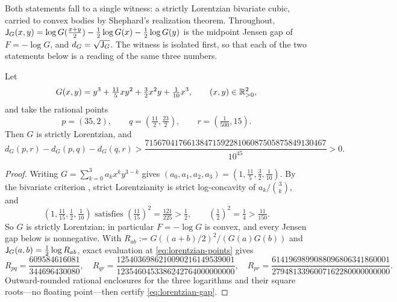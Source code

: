 \begin{cxrefutation}
Both statements fall to a single witness: a strictly Lorentzian bivariate cubic, carried to convex bodies by Shephard's realization theorem.  Throughout, $\mathsf{J}_G(x,y)=\log G(\frac{x+y}2)-\frac12\log G(x)-\frac12\log G(y)$ is the midpoint Jensen gap of $F=-\log G$, and $d_G=\sqrt{\mathsf{J}_G}$.  The witness is isolated first, so that each of the two statements below is a reading of the same three numbers.

\begin{lemma}\label{lem:lorentzian-cubic}
Let
\begin{equation}\label{eq:lorentzian-cubic}
G(x,y)=y^3+\tfrac{11}5xy^2+\tfrac32x^2y+\tfrac1{10}x^3,\qquad(x,y)\in\mathbb R_{>0}^2,
\end{equation}
and take the rational points
\begin{equation}\label{eq:lorentzian-points}
p=(35,2),\qquad q=\left(\tfrac{11}2,\tfrac{23}2\right),\qquad r=\left(\tfrac1{500},15\right).
\end{equation}
Then $G$ is strictly Lorentzian, and
\begin{equation}\label{eq:lorentzian-gap}
d_G(p,r)-d_G(p,q)-d_G(q,r)>\frac{7156704176613847159228106087505875849130467}{10^{45}}>0.
\end{equation}
\end{lemma}
\begin{proof}
Writing $G=\sum_{k=0}^3a_kx^ky^{3-k}$ gives $(a_0,a_1,a_2,a_3)=(1,\frac{11}5,\frac32,\frac1{10})$.  By the bivariate criterion \cite[Example~2.3]{BrandenHuh}, strict Lorentzianity is strict log-concavity of $a_k/\binom3k$, and
\[
\left(1,\tfrac{11}{15},\tfrac12,\tfrac1{10}\right)
\text{ satisfies }
\left(\tfrac{11}{15}\right)^2=\tfrac{121}{225}>\tfrac12,\qquad
\left(\tfrac12\right)^2=\tfrac14>\tfrac{11}{150}.
\]
So $G$ is strictly Lorentzian; in particular $F=-\log G$ is convex, and every Jensen gap below is nonnegative.  With $R_{ab}:=G((a+b)/2)^2/(G(a)G(b))$ and $\mathsf{J}_G(a,b)=\frac12\log R_{ab}$, exact evaluation at \eqref{eq:lorentzian-points} gives
\[
R_{pq}=\frac{609584616081}{344696430080},\quad
R_{qr}=\frac{1254036986210090216149539001}{1235460453386242764000000000},\quad
R_{pr}=\frac{6141969899088096806341860001}{2794813396007162280000000000}.
\]
Outward-rounded rational enclosures for the three logarithms and their square roots---no floating point---then certify \eqref{eq:lorentzian-gap}.
\end{proof}


\end{cxrefutation}
